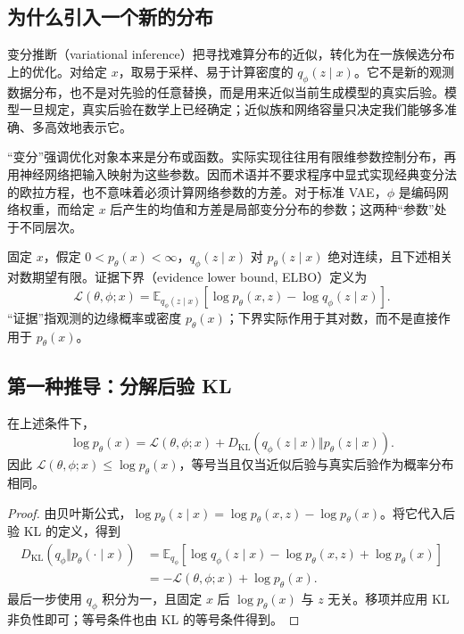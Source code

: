\documentclass[UTF8,12pt,a4paper,fontset=fandol]{ctexart}
\begin{document}
\subsection{为什么引入一个新的分布}
变分推断（variational inference）把寻找难算分布的近似，转化为在一族候选分布上的优化。对给定 $x$，取易于采样、易于计算密度的 $q_\phi(z\mid x)$。它不是新的观测数据分布，也不是对先验的任意替换，而是用来近似当前生成模型的真实后验。模型一旦规定，真实后验在数学上已经确定；近似族和网络容量只决定我们能够多准确、多高效地表示它。

“变分”强调优化对象本来是分布或函数。实际实现往往用有限维参数控制分布，再用神经网络把输入映射为这些参数。因而术语并不要求程序中显式实现经典变分法的欧拉方程，也不意味着必须计算网络参数的方差。对于标准 VAE，$\phi$ 是编码网络权重，而给定 $x$ 后产生的均值和方差是局部变分分布的参数；这两种“参数”处于不同层次。

\begin{definition}[证据下界]
固定 $x$，假定 $0<p_\theta(x)<\infty$，$q_\phi(z\mid x)$ 对 $p_\theta(z\mid x)$ 绝对连续，且下述相关对数期望有限。证据下界（evidence lower bound, ELBO）定义为
\begin{equation}
 \mathcal L(\theta,\phi;x)
 =\mathbb E_{q_\phi(z\mid x)}
  [\log p_\theta(x,z)-\log q_\phi(z\mid x)].
 \label{eq:vae-elbo-definition}
\end{equation}
“证据”指观测的边缘概率或密度 $p_\theta(x)$；下界实际作用于其对数，而不是直接作用于 $p_\theta(x)$。
\end{definition}

\subsection{第一种推导：分解后验 KL}
\begin{proposition}[变分分解]
在上述条件下，
\begin{equation}
 \log p_\theta(x)=\mathcal L(\theta,\phi;x)
 +D_{\mathrm{KL}}\!\left(q_\phi(z\mid x)\Vert p_\theta(z\mid x)\right).
 \label{eq:vae-gap}
\end{equation}
因此 $\mathcal L(\theta,\phi;x)\leq\log p_\theta(x)$，等号当且仅当近似后验与真实后验作为概率分布相同。
\end{proposition}
\begin{proof}
由贝叶斯公式，$\log p_\theta(z\mid x)=\log p_\theta(x,z)-\log p_\theta(x)$。将它代入后验 KL 的定义，得到
\begin{align*}
 D_{\mathrm{KL}}(q_\phi\Vert p_\theta(\cdot\mid x))
 &=\mathbb E_{q_\phi}[\log q_\phi(z\mid x)-\log p_\theta(x,z)
                    +\log p_\theta(x)]\\
 &=-\mathcal L(\theta,\phi;x)+\log p_\theta(x).
\end{align*}
最后一步使用 $q_\phi$ 积分为一，且固定 $x$ 后 $\log p_\theta(x)$ 与 $z$ 无关。移项并应用 KL 非负性即可；等号条件也由 KL 的等号条件得到。
\end{proof}
\end{document}
